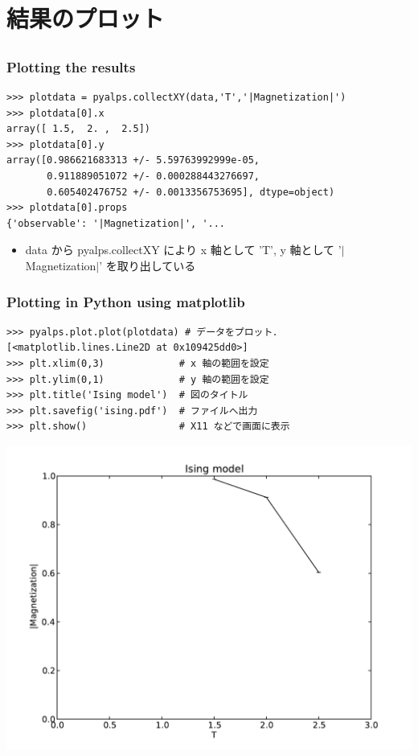 \section{結果のプロット}
\subsection*{\redm\whiteb\greenb}

\begin{frame}[t,fragile]
\frametitle{Plotting the results}
\begin{lstlisting}
>>> plotdata = pyalps.collectXY(data,'T','|Magnetization|')
>>> plotdata[0].x
array([ 1.5,  2. ,  2.5])
>>> plotdata[0].y
array([0.986621683313 +/- 5.59763992999e-05,
       0.911889051072 +/- 0.000288443276697,
       0.605402476752 +/- 0.0013356753695], dtype=object)
>>> plotdata[0].props
{'observable': '|Magnetization|', '...
\end{lstlisting}
\begin{itemize}
\item data から pyalps.collectXY により x 軸として 'T', y 軸として '$|$Magnetization$|$' を取り出している
\end{itemize}
\end{frame}

\begin{frame}[t,fragile]
\frametitle{Plotting in Python using matplotlib}
\begin{lstlisting}
>>> pyalps.plot.plot(plotdata) # データをプロット．
[<matplotlib.lines.Line2D at 0x109425dd0>]
>>> plt.xlim(0,3)             # x 軸の範囲を設定
>>> plt.ylim(0,1)             # y 軸の範囲を設定
>>> plt.title('Ising model')  # 図のタイトル
>>> plt.savefig('ising.pdf')  # ファイルへ出力
>>> plt.show()                # X11 などで画面に表示
\end{lstlisting}
\includegraphics[scale=0.2]{ising.pdf}
\end{frame}

